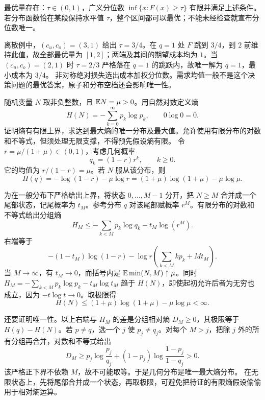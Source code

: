 最优量存在：$\tau\in(0,1)$，广义分位数 $\inf\{x:F(x)\ge\tau\}$ 有限并满足上述条件。若分布函数恰在某段保持水平值 $\tau$，整个区间都可以最优；不能未经检查就宣布分位数唯一。

离散例中，$(c_u,c_o)=(3,1)$ 给出 $\tau=3/4$。在 $q=1$ 处 $F$ 跳到 $3/4$，到 $2$ 前维持此值，故全部最优量为 $[1,2]$；两端及其间的期望成本均为 $1$。当 $(c_u,c_o)=(2,1)$ 时 $\tau=2/3$ 严格落在 $q=1$ 的跳跃内，故唯一解为 $q=1$，最小成本为 $3/4$。
\insight 非对称绝对损失选出成本加权分位数。需求均值一般不是这个决策问题的最优答案，原子和分布空档还会影响唯一性。

随机变量 $N$ 取非负整数，且 $\mathbb{E} N=\mu>0$。用自然对数定义熵
\[
H(N)=-\sum_{k=0}^\infty p_k\log p_k,\qquad 0\log0=0.
\]
证明熵有有限上界，求达到最大熵的唯一分布及最大值。允许使用有限分布的对数和不等式，但须处理无限支撑，不得预先假设熵有限。
\solution 令 $r=\mu/(1+\mu)\in(0,1)$，考虑几何概率
\[
q_k=(1-r)r^k,\qquad k\ge0.
\]
它的均值为 $r/(1-r)=\mu$。若 $N$ 服从该分布，则
\[
H(q)=-\log(1-r)-\mu\log r
=(1+\mu)\log(1+\mu)-\mu\log\mu.
\]

为在一般分布下严格给出上界，将状态 $0,\ldots,M-1$ 分开，把 $N\ge M$ 合并成一个尾部状态，记尾概率为 $t_M$。参考分布 $q$ 对该尾部赋概率 $r^M$。有限分布的对数和不等式给出分组熵
\[
H_M\le-\sum_{k<M}p_k\log q_k-t_M\log(r^M).
\]
右端等于
\[
-(1-t_M)\log(1-r)
-\log r\left(\sum_{k<M}kp_k+Mt_M\right).
\]
当 $M\to\infty$，有 $t_M\to0$，而括号内是 $\mathbb{E}\min(N,M)\uparrow\mu$。同时
$H_M=-\sum_{k<M}p_k\log p_k-t_M\log t_M$ 趋于 $H(N)$，即使起初允许后者为无穷也成立，因为 $-t\log t\to0$。取极限得
\[
H(N)\le(1+\mu)\log(1+\mu)-\mu\log\mu<\infty.
\]

还要证明唯一性。以上右端与 $H_M$ 的差是分组相对熵 $D_M\ge0$，其极限等于 $H(q)-H(N)$。若 $p\ne q$，选一个 $j$ 使 $p_j\ne q_j$。对每个 $M>j$，把除 $j$ 外的所有分组再合并，对数和不等式给出
\[
D_M\ge
p_j\log\frac{p_j}{q_j}
+(1-p_j)\log\frac{1-p_j}{1-q_j}>0.
\]
该严格正下界不依赖 $M$，故不可能取等。于是几何分布是唯一最大熵分布。
\insight 在无限状态上，先将尾部合并成一个状态，再取极限，可避免把待证的有限熵假设偷偷用于相对熵运算。

